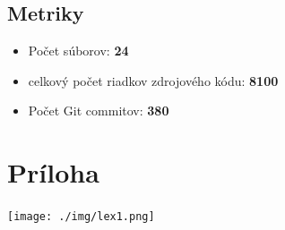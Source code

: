 \documentclass[12pt,a4paper]{report}
\begin{document}
\section{Metriky}

\begin{itemize}
\item Počet súborov: \textbf{24}
\item celkový počet riadkov zdrojového kódu: \textbf{8100}
\item Počet Git commitov: \textbf{380}
\end{itemize}


\chapter{Príloha}
\texttt{[image: ./img/lex1.png]}\\
\end{document}
